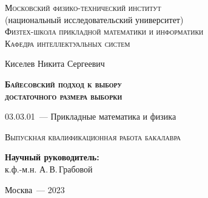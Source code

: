 \thispagestyle{empty}


\begin{titlepage}
\begin{center}
\textsc{Московский физико-технический институт}\\
(национальный исследовательский университет)\\
\textsc{Физтех-школа прикладной математики и информатики}\\
\textsc{Кафедра интеллектуальных систем}
\end{center}
\vspace{4cm}
\begin{center}
{Киселев Никита Сергеевич}
\par
\vspace{2cm}
{\Large \textsc{\textbf{Байесовский подход к выбору\\ достаточного размера выборки}}}
\par
\vspace{2cm}
{03.03.01~--- Прикладные математика и физика}
\par
\vspace{2cm}
\textsc{Выпускная квалификационная работа бакалавра}
\end{center}
\vspace{2cm}
\hfill\parbox{8,4cm}{\textbf{Научный руководитель:}
\\к.ф.-м.н. А.\,В.\,Грабовой}
\par
\vspace{3.5cm}
\begin{center}
{Москва~--- 2023}
\end{center}
\end{titlepage}